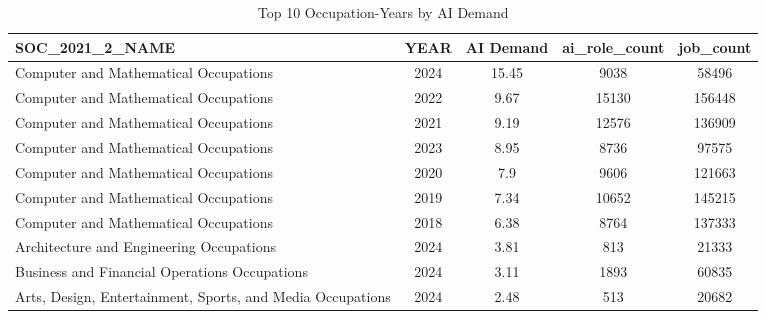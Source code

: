 \begin{table}[htbp]
\caption{Top 10 Occupation-Years by AI Demand}
\label{tab:top_occ_years}
\begin{tabular}{lcccc}
\hline\hline
SOC\_2021\_2\_NAME & YEAR & AI Demand & ai\_role\_count & job\_count \\
\hline
Computer and Mathematical Occupations & 2024 & 15.45 & 9038 & 58496 \\
Computer and Mathematical Occupations & 2022 & 9.67 & 15130 & 156448 \\
Computer and Mathematical Occupations & 2021 & 9.19 & 12576 & 136909 \\
Computer and Mathematical Occupations & 2023 & 8.95 & 8736 & 97575 \\
Computer and Mathematical Occupations & 2020 & 7.9 & 9606 & 121663 \\
Computer and Mathematical Occupations & 2019 & 7.34 & 10652 & 145215 \\
Computer and Mathematical Occupations & 2018 & 6.38 & 8764 & 137333 \\
Architecture and Engineering Occupations & 2024 & 3.81 & 813 & 21333 \\
Business and Financial Operations Occupations & 2024 & 3.11 & 1893 & 60835 \\
Arts, Design, Entertainment, Sports, and Media Occupations & 2024 & 2.48 & 513 & 20682 \\
\hline\hline
\end{tabular}
\end{table}
